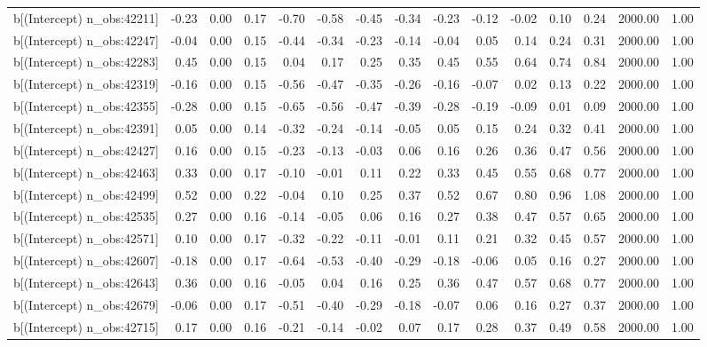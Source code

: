 \begin{table}[ht]
\begin{tabular}{rrrrrrrrrrrrrrr}
  b[(Intercept) n\_obs:42211] & -0.23 & 0.00 & 0.17 & -0.70 & -0.58 & -0.45 & -0.34 & -0.23 & -0.12 & -0.02 & 0.10 & 0.24 & 2000.00 & 1.00 \\ 
  b[(Intercept) n\_obs:42247] & -0.04 & 0.00 & 0.15 & -0.44 & -0.34 & -0.23 & -0.14 & -0.04 & 0.05 & 0.14 & 0.24 & 0.31 & 2000.00 & 1.00 \\ 
  b[(Intercept) n\_obs:42283] & 0.45 & 0.00 & 0.15 & 0.04 & 0.17 & 0.25 & 0.35 & 0.45 & 0.55 & 0.64 & 0.74 & 0.84 & 2000.00 & 1.00 \\ 
  b[(Intercept) n\_obs:42319] & -0.16 & 0.00 & 0.15 & -0.56 & -0.47 & -0.35 & -0.26 & -0.16 & -0.07 & 0.02 & 0.13 & 0.22 & 2000.00 & 1.00 \\ 
  b[(Intercept) n\_obs:42355] & -0.28 & 0.00 & 0.15 & -0.65 & -0.56 & -0.47 & -0.39 & -0.28 & -0.19 & -0.09 & 0.01 & 0.09 & 2000.00 & 1.00 \\ 
  b[(Intercept) n\_obs:42391] & 0.05 & 0.00 & 0.14 & -0.32 & -0.24 & -0.14 & -0.05 & 0.05 & 0.15 & 0.24 & 0.32 & 0.41 & 2000.00 & 1.00 \\ 
  b[(Intercept) n\_obs:42427] & 0.16 & 0.00 & 0.15 & -0.23 & -0.13 & -0.03 & 0.06 & 0.16 & 0.26 & 0.36 & 0.47 & 0.56 & 2000.00 & 1.00 \\ 
  b[(Intercept) n\_obs:42463] & 0.33 & 0.00 & 0.17 & -0.10 & -0.01 & 0.11 & 0.22 & 0.33 & 0.45 & 0.55 & 0.68 & 0.77 & 2000.00 & 1.00 \\ 
  b[(Intercept) n\_obs:42499] & 0.52 & 0.00 & 0.22 & -0.04 & 0.10 & 0.25 & 0.37 & 0.52 & 0.67 & 0.80 & 0.96 & 1.08 & 2000.00 & 1.00 \\ 
  b[(Intercept) n\_obs:42535] & 0.27 & 0.00 & 0.16 & -0.14 & -0.05 & 0.06 & 0.16 & 0.27 & 0.38 & 0.47 & 0.57 & 0.65 & 2000.00 & 1.00 \\ 
  b[(Intercept) n\_obs:42571] & 0.10 & 0.00 & 0.17 & -0.32 & -0.22 & -0.11 & -0.01 & 0.11 & 0.21 & 0.32 & 0.45 & 0.57 & 2000.00 & 1.00 \\ 
  b[(Intercept) n\_obs:42607] & -0.18 & 0.00 & 0.17 & -0.64 & -0.53 & -0.40 & -0.29 & -0.18 & -0.06 & 0.05 & 0.16 & 0.27 & 2000.00 & 1.00 \\ 
  b[(Intercept) n\_obs:42643] & 0.36 & 0.00 & 0.16 & -0.05 & 0.04 & 0.16 & 0.25 & 0.36 & 0.47 & 0.57 & 0.68 & 0.77 & 2000.00 & 1.00 \\ 
  b[(Intercept) n\_obs:42679] & -0.06 & 0.00 & 0.17 & -0.51 & -0.40 & -0.29 & -0.18 & -0.07 & 0.06 & 0.16 & 0.27 & 0.37 & 2000.00 & 1.00 \\ 
  b[(Intercept) n\_obs:42715] & 0.17 & 0.00 & 0.16 & -0.21 & -0.14 & -0.02 & 0.07 & 0.17 & 0.28 & 0.37 & 0.49 & 0.58 & 2000.00 & 1.00 \\ 

\end{tabular}
\end{table}

